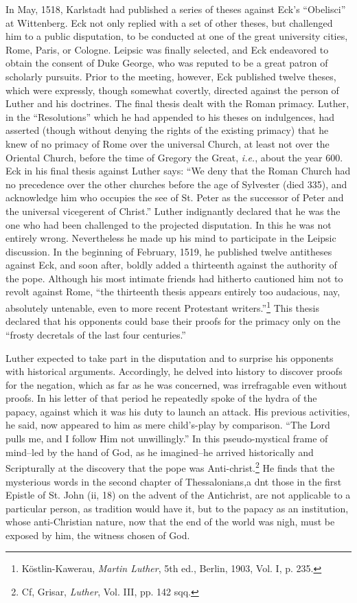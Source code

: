 In May, 1518, Karlstadt had published a series of theses against
Eck’s “Obelisci” at Wittenberg. Eck not only replied with a set of
other theses, but challenged him to a public disputation, to be conducted
at one of the great university cities, Rome, Paris, or Cologne.
Leipsic was finally selected, and Eck endeavored to obtain the consent
of Duke George, who was reputed to be a great patron of scholarly
pursuits. Prior to the meeting, however, Eck published twelve
theses, which were expressly, though somewhat covertly, directed
against the person of Luther and his doctrines. The final thesis dealt
with the Roman primacy. Luther, in the “Resolutions” which he had
appended to his theses on indulgences, had asserted (though without
denying the rights of the existing primacy) that he knew of no primacy
of Rome over the universal Church, at least not over the Oriental Church,
before the time of Gregory the Great, \textit{i.e.}, about the
year 600. Eck in his final thesis against Luther says: “We deny that
the Roman Church had no precedence over the other churches before
the age of Sylvester (died 335), and acknowledge him who occupies
the see of St. Peter as the successor of Peter and the universal vicegerent
of Christ.” Luther indignantly declared that he was the one
who had been challenged to the projected disputation. In this he was
not entirely wrong. Nevertheless he made up his mind to participate
in the Leipsic discussion. In the beginning of February, 1519, he
published twelve antitheses against Eck, and soon after, boldly added
a thirteenth against the authority of the pope. Although his most intimate
friends had hitherto cautioned him not to revolt against Rome,
“the thirteenth thesis appears entirely too audacious, nay, absolutely
untenable, even to more recent Protestant writers.”\footnote
{Köstlin-Kawerau, \textit{Martin Luther}, 5th ed., Berlin, 1903, Vol. I, p. 235.}
This thesis
declared that his opponents could base their proofs for the primacy only
on the “frosty decretals of the last four centuries.”

Luther expected to take part in the disputation and to surprise his
opponents with historical arguments. Accordingly, he delved into
history to discover proofs for the negation, which as far as he was
concerned, was irrefragable even without proofs. In his letter of that
period he repeatedly spoke of the hydra of the papacy, against which
it was his duty to launch an attack. His previous activities, he said,
now appeared to him as mere child's-play by comparison. ``The Lord
pulls me, and I follow Him not unwillingly.'' In this pseudo-mystical
frame of mind--led by the hand of God, as he imagined--he arrived
historically and Scripturally at the discovery that the pope was Anti-christ.\footnote
{Cf, Grisar, \textit{Luther}, Vol. III, pp. 142 sqq.}
He finds that the mysterious words in the second chapter of
Thessalonians,a dnt those in the first Epistle of St. John (ii, 18) on the
advent of the Antichrist, are not applicable to a particular person, as
tradition would have it, but to the papacy as an institution, whose anti-Christian
nature, now that the end of the world was nigh, must be
exposed by him, the witness chosen of God.


